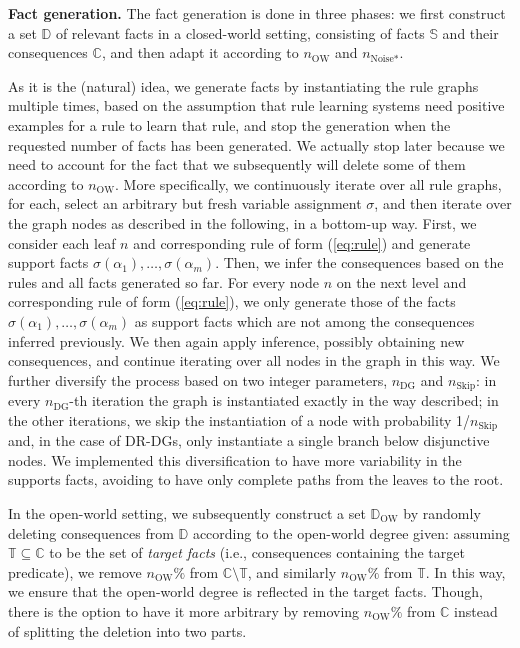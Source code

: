 \documentclass[letterpaper]{article} \usepackage{aaai20}  \usepackage{times}  \usepackage{helvet} \usepackage{courier}  \usepackage[hyphens]{url}  \usepackage{graphicx} \urlstyle{rm} \def\UrlFont{\rm}  \usepackage{graphicx}  \frenchspacing  \setlength{\pdfpagewidth}{8.5in}  \setlength{\pdfpageheight}{11in}  \usepackage{amsthm}
\theoremstyle{definition}
\newcommand{\support}{\text{support}\xspace}
\newcommand{\nowa}{\ensuremath{n_{\text{OW}}}\xspace}
\newcommand{\nnoise}{\ensuremath{n_{\text{Noise*}}}\xspace}
\newcommand{\ndag}{\ensuremath{n_{\text{DG}}}\xspace}
\newcommand{\nnskip}{\ensuremath{n_{\text{Skip}}}\xspace}
\newcommand{\db}{\ensuremath{\mathbb{D}}\xspace}\newcommand{\dbowa}{\ensuremath{\db_{\text{OW}}}\xspace}
\newcommand{\sfacts}{\ensuremath{\mathbb{S}}\xspace}
\newcommand{\cfacts}{\ensuremath{\mathbb{C}}\xspace}
\newcommand{\tfacts}{\ensuremath{\mathbb{T}}\xspace}
\begin{document}
\textbf{Fact generation.}
The fact generation is done in three phases: we first construct a set \db of relevant facts in a closed-world setting, consisting of {\support facts} \sfacts and their {consequences} \cfacts, and then adapt it according to \nowa and \nnoise. 


As it is the (natural) idea, we generate facts by instantiating the rule graphs multiple times,
based on the assumption that rule learning systems need positive examples for a rule to learn that rule, and stop the generation when the requested number of facts has been generated. We actually stop later because we need to account for the fact that we subsequently will delete some of them according to \nowa. 
More specifically, we continuously iterate over all rule graphs, for each, select an arbitrary but fresh variable assignment $\sigma$, and then iterate over the graph nodes as described in the following, in a bottom-up way. 
First, we consider each leaf $n$ and corresponding rule of form (\ref{eq:rule}) and generate support facts $\sigma(\alpha_1),\dots,\sigma(\alpha_m)$.
Then, we infer the consequences based on the rules and all facts generated so far. For every node $n$ on the next level and corresponding rule of form (\ref{eq:rule}), we only generate those of the facts $\sigma(\alpha_1),\dots,\sigma(\alpha_m)$ as support facts which are not among the consequences inferred previously. We then again apply inference, possibly obtaining new consequences, and continue iterating over all nodes in the graph in this way.
We further diversify the process based on two integer parameters, \ndag and \nnskip: in every \ndag-th iteration the graph is instantiated exactly in the way  described; in the other iterations, we skip the instantiation of a node with probability 1/\nnskip and, in the case of DR-DGs, only instantiate a single branch below disjunctive nodes. We implemented this diversification to have more variability in the supports facts, avoiding to have only complete paths from the leaves to the root.

In the open-world setting, we subsequently construct a set \dbowa by randomly deleting consequences from \db according to the open-world degree given: 
assuming $\tfacts\subseteq\cfacts$ to be the set of \emph{target facts} (i.e., consequences containing the target predicate), 
we remove $\nowa\%$ from $\cfacts\setminus\tfacts$, and similarly $\nowa\%$ from \tfacts.
In this way, we ensure that the open-world degree is reflected in the target facts. Though, there is the option to have it more arbitrary by removing $\nowa\%$ from $\cfacts$ instead of splitting the deletion into two parts.
\end{document}

